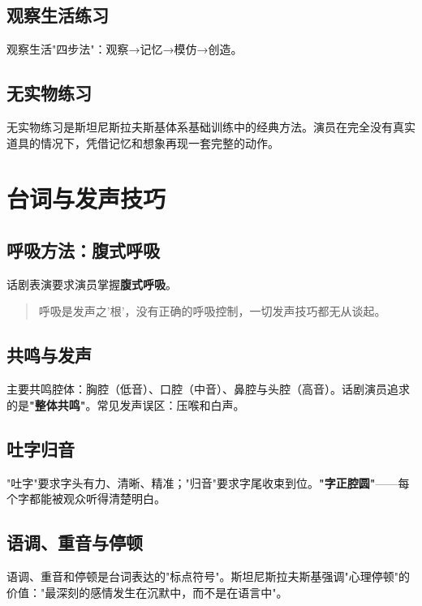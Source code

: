 \subsection{观察生活练习}

观察生活"四步法"：观察→记忆→模仿→创造\cite{zhang:acting}。

\subsection{无实物练习}

无实物练习是斯坦尼斯拉夫斯基体系基础训练中的经典方法。演员在完全没有真实道具的情况下，凭借记忆和想象再现一套完整的动作\cite{stanislavski:system}。

\section{台词与发声技巧}

\subsection{呼吸方法：腹式呼吸}

话剧表演要求演员掌握\textbf{腹式呼吸}\cite{liu:speech}。

\begin{quote}
呼吸是发声之'根'，没有正确的呼吸控制，一切发声技巧都无从谈起。\cite{liu:speech}
\end{quote}

\subsection{共鸣与发声}

主要共鸣腔体：胸腔（低音）、口腔（中音）、鼻腔与头腔（高音）。话剧演员追求的是\textbf{"整体共鸣"}。常见发声误区：压喉和白声。

\subsection{吐字归音}

"吐字"要求字头有力、清晰、精准；"归音"要求字尾收束到位。\textbf{"字正腔圆"}——每个字都能被观众听得清楚明白。

\subsection{语调、重音与停顿}

语调、重音和停顿是台词表达的"标点符号"。斯坦尼斯拉夫斯基强调"心理停顿"的价值："最深刻的感情发生在沉默中，而不是在语言中"\cite{stanislavski:system}。

